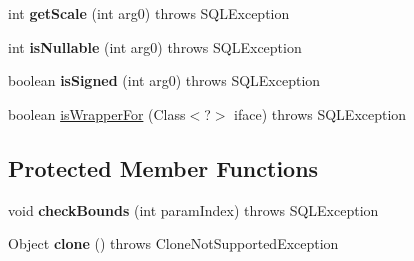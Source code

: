 \begin{DoxyCompactItemize}
\mbox{\label{classcom_1_1mysql_1_1jdbc_1_1_callable_statement_1_1_callable_statement_param_info_a52f38fb7e6923b02b9da95c0b5f485da}} 
int {\bfseries get\+Scale} (int arg0)  throws S\+Q\+L\+Exception 
\item 
\mbox{\label{classcom_1_1mysql_1_1jdbc_1_1_callable_statement_1_1_callable_statement_param_info_abafa7680223a8ddae211602bfd572a56}} 
int {\bfseries is\+Nullable} (int arg0)  throws S\+Q\+L\+Exception 
\item 
\mbox{\label{classcom_1_1mysql_1_1jdbc_1_1_callable_statement_1_1_callable_statement_param_info_a7abd3d881db8f6a59859e46a0d72a4a4}} 
boolean {\bfseries is\+Signed} (int arg0)  throws S\+Q\+L\+Exception 
\item 
boolean \mbox{\hyperlink{classcom_1_1mysql_1_1jdbc_1_1_callable_statement_1_1_callable_statement_param_info_a4bd267bd570090dd11271f8186a5c1c1}{is\+Wrapper\+For}} (Class$<$?$>$ iface)  throws S\+Q\+L\+Exception 
\end{DoxyCompactItemize}
\subsection*{Protected Member Functions}
\begin{DoxyCompactItemize}
\item 
\mbox{\label{classcom_1_1mysql_1_1jdbc_1_1_callable_statement_1_1_callable_statement_param_info_ae8d002da99a9b5dc27b31639c1d52544}} 
void {\bfseries check\+Bounds} (int param\+Index)  throws S\+Q\+L\+Exception 
\item 
\mbox{\label{classcom_1_1mysql_1_1jdbc_1_1_callable_statement_1_1_callable_statement_param_info_a9c3fc65a9c27094c5982531e84bcf4a9}} 
Object {\bfseries clone} ()  throws Clone\+Not\+Supported\+Exception 
\end{DoxyCompactItemize}


